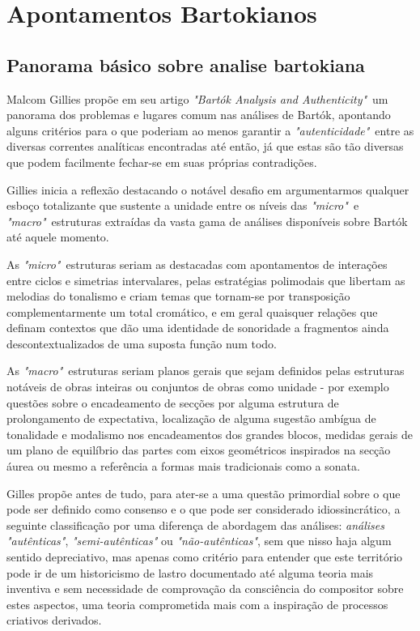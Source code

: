 \documentclass[
	12pt,				%
	openright,			%
	twoside,			%
	a4paper,			%
	english,			%
	french,				%
	spanish,			%
	brazil				%
	]{abntex2}
\begin{document}
\chapter{Apontamentos Bartokianos}

\section{Panorama básico sobre analise bartokiana}

Malcom Gillies propõe em seu artigo \textit{"Bartók Analysis and Authenticity"}\cite{gillies1995bartok}\ um panorama dos problemas e lugares comum nas análises de Bartók, apontando alguns critérios para o que poderiam ao menos garantir a \textit{"autenticidade"}\ entre as diversas correntes analíticas encontradas até então, já que estas são tão diversas que podem facilmente fechar-se em suas próprias contradições. 

Gillies inicia a reflexão destacando o notável desafio em argumentarmos qualquer esboço totalizante que sustente a unidade entre os níveis das \textit{ "micro"}\ e \textit{"macro"}\ estruturas extraídas da vasta gama de análises disponíveis sobre Bartók até aquele momento.

As \textit{ "micro"}\ estruturas seriam as destacadas com apontamentos de interações entre ciclos e simetrias intervalares, pelas estratégias polimodais que libertam as melodias do tonalismo e criam temas que tornam-se por transposição complementarmente um total cromático, e em geral quaisquer relações que definam contextos que dão uma identidade de sonoridade a fragmentos ainda descontextualizados de uma suposta função num todo. 

As \textit{"macro"}\ estruturas seriam planos gerais que sejam definidos pelas estruturas notáveis de obras inteiras ou conjuntos de obras como unidade - por exemplo questões sobre o encadeamento de secções por alguma estrutura de prolongamento de expectativa, localização de alguma sugestão ambígua de tonalidade e modalismo nos encadeamentos dos grandes blocos, medidas gerais de um plano de equilíbrio das partes com eixos geométricos inspirados na secção áurea ou mesmo a referência a formas mais tradicionais como a sonata.

Gilles propõe antes de tudo, para ater-se a uma questão primordial sobre o que pode ser definido como consenso e o que pode ser considerado idiossincrático, a seguinte classificação por uma diferença de abordagem das análises: \textit{análises "autênticas"}, \textit{"semi-autênticas"} ou \textit{"não-autênticas"}, sem que nisso haja algum sentido depreciativo, mas apenas como critério para entender que este território pode ir de um historicismo de lastro documentado até alguma teoria mais inventiva e sem necessidade de comprovação da consciência do compositor sobre estes aspectos, uma teoria comprometida mais com a inspiração de processos criativos derivados.
\end{document}
